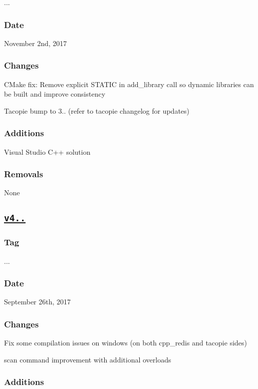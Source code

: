 {..}. \subsubsection*{Date}

November 2nd, 2017 \subsubsection*{Changes}


\begin{DoxyItemize}
\item C\+Make fix\+: Remove explicit S\+T\+A\+T\+IC in add\+\_\+library call so dynamic libraries can be built and improve consistency
\item Tacopie bump to 3.. (refer to tacopie changelog for updates) \subsubsection*{Additions}
\end{DoxyItemize}


\begin{DoxyItemize}
\item Visual Studio C++ solution \subsubsection*{Removals}
\end{DoxyItemize}

None

\subsection*{\href{https://github.com/Cylix/cpp_redis/releases/tag/4.1.0}{\tt v4..}}

\subsubsection*{Tag}

{..}. \subsubsection*{Date}

September 26th, 2017 \subsubsection*{Changes}


\begin{DoxyItemize}
\item Fix some compilation issues on windows (on both cpp\+\_\+redis and tacopie sides)
\item scan command improvement with additional overloads \subsubsection*{Additions}
\end{DoxyItemize}


